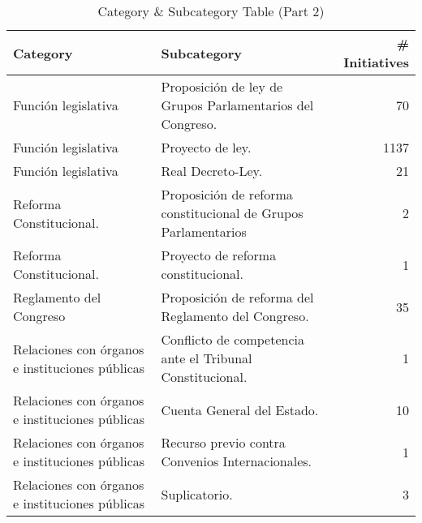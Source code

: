\begin{table}[H]
\centering
\renewcommand{\arraystretch}{1.3}
\begin{tabularx}{\textwidth}{l l r}
\toprule
\textbf{Category} & \textbf{Subcategory} & \textbf{\# Initiatives} \\
\midrule
Función legislativa & Proposición de ley de Grupos Parlamentarios del Congreso. & 70 \\
Función legislativa & Proyecto de ley. & 1137 \\
Función legislativa & Real Decreto-Ley. & 21 \\
Reforma Constitucional. & Proposición de reforma constitucional de Grupos Parlamentarios & 2 \\
Reforma Constitucional. & Proyecto de reforma constitucional. & 1 \\
Reglamento del Congreso & Proposición de reforma del Reglamento del Congreso. & 35 \\
Relaciones con órganos e instituciones públicas & Conflicto de competencia ante el Tribunal Constitucional. & 1 \\
Relaciones con órganos e instituciones públicas & Cuenta General del Estado. & 10 \\
Relaciones con órganos e instituciones públicas & Recurso previo contra Convenios Internacionales. & 1 \\
Relaciones con órganos e instituciones públicas & Suplicatorio. & 3 \\
\bottomrule
\end{tabularx}
\caption{Category & Subcategory Table (Part 2)}
\label{tab:cat_subcat_2}
\end{table}